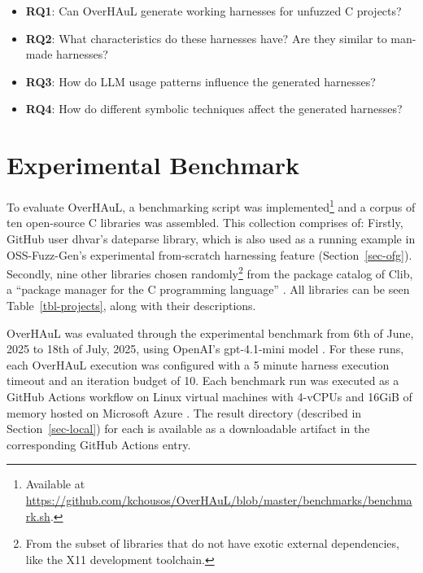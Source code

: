 \documentclass[
  a4paper,
]{scrreprt}
\theoremstyle{definition}
\theoremstyle{remark}
\begin{document}
\begin{itemize}
\item
  \textbf{RQ1}: Can OverHAuL generate working harnesses for unfuzzed C
  projects?
\item
  \textbf{RQ2}: What characteristics do these harnesses have? Are they
  similar to man-made harnesses?
\item
  \textbf{RQ3}: How do LLM usage patterns influence the generated
  harnesses?
\item
  \textbf{RQ4}: How do different symbolic techniques affect the
  generated harnesses?
\end{itemize}

\section{Experimental Benchmark}\label{sec-benchmark}

To evaluate OverHAuL, a benchmarking script was implemented\footnote{Available
  at
  \url{https://github.com/kchousos/OverHAuL/blob/master/benchmarks/benchmark.sh}.}
and a corpus of ten open-source C libraries was assembled. This
collection comprises of: Firstly, GitHub user dhvar's dateparse library,
which is also used as a running example in OSS-Fuzz-Gen's
\autocite{oss-fuzz-gen} experimental from-scratch harnessing feature
(Section~\ref{sec-ofg}). Secondly, nine other libraries chosen
randomly\footnote{From the subset of libraries that do not have exotic
  external dependencies, like the X11 development toolchain.} from the
package catalog of Clib, a ``package manager for the C programming
language'' \autocite{clibs,clib}. All libraries can be seen
Table~\ref{tbl-projects}, along with their descriptions.

OverHAuL was evaluated through the experimental benchmark from 6th of
June, 2025 to 18th of July, 2025, using OpenAI's gpt-4.1-mini model
\autocite{openaidocs2025}. For these runs, each OverHAuL execution was
configured with a 5 minute harness execution timeout and an iteration
budget of 10. Each benchmark run was executed as a GitHub Actions
workflow on Linux virtual machines with 4-vCPUs and 16GiB of memory
hosted on Microsoft Azure \autocite{githubdocs2025a,githubdocs2025}. The
result directory (described in Section~\ref{sec-local}) for each is
available as a downloadable artifact in the corresponding GitHub Actions
entry.
\end{document}
